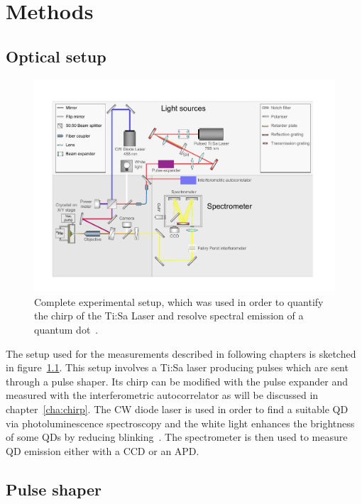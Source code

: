 \chapter{Methods}
\label{cha:methods}

\section{Optical setup}

\begin{figure}[H]
	\centering
	\includegraphics[width=1\linewidth]{figures/setup/Setup_flat}
	\caption[Complete experimental setup]{Complete experimental setup, which was used in order to quantify the chirp of the Ti:Sa Laser and resolve spectral emission of a quantum dot~\cite{schimpf_towards_2017}.}
	\label{fig:setupflat}
\end{figure}


The setup used for the measurements described in following chapters is sketched in figure~\ref{fig:setupflat}.
This setup involves a Ti:Sa laser producing pulses which are sent through a pulse shaper.
Its chirp can be modified with the pulse expander and measured with the interferometric autocorrelator as will be discussed in chapter~\ref{cha:chirp}.
The CW diode laser is used in order to find a suitable \ac{QD} via photoluminescence spectroscopy and the white light enhances the brightness of some \acp{QD} by reducing blinking~\cite{jahn_artificial_2015}.
The spectrometer is then used to measure \ac{QD} emission either with a CCD or an APD.  

\section{Pulse shaper}

